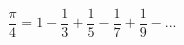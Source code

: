 \documentclass[main.tex]{article}
\begin{document}
\begin{equation}
    \frac{\pi}{4} = 1 - \frac{1}{3} + \frac{1}{5} - \frac{1}{7} + \frac{1}{9} - ...
\end{equation}
\end{document}
